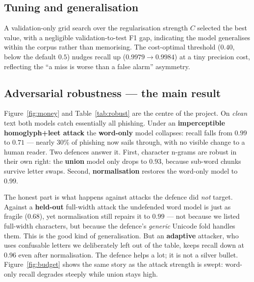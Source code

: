 \documentclass[11pt]{article}
\begin{document}
\subsection{Tuning and generalisation}
A validation-only grid search over the regularisation strength $C$ selected the best
value, with a negligible validation-to-test F1 gap, indicating the model generalises
within the corpus rather than memorising. The cost-optimal threshold ($0.40$, below
the default $0.5$) nudges recall up ($0.9979 \rightarrow 0.9984$) at a tiny precision
cost, reflecting the ``a miss is worse than a false alarm'' asymmetry.

\subsection{Adversarial robustness --- the main result}
\label{sec:robust}
Figure~\ref{fig:money} and Table~\ref{tab:robust} are the centre of the project. On
\emph{clean} text both models catch essentially all phishing. Under an
\textbf{imperceptible homoglyph+leet attack} the \textbf{word-only} model collapses:
recall falls from $0.99$ to $0.71$ --- nearly 30\% of phishing now sails through,
with no visible change to a human reader. Two defences answer it. First, character
n-grams are robust in their own right: the \textbf{union} model only drops to
$0.93$, because sub-word chunks survive letter swaps. Second, \textbf{normalisation}
restores the word-only model to $0.99$.

The honest part is what happens against attacks the defence did \emph{not} target.
Against a \textbf{held-out} full-width attack the undefended word model is just as
fragile ($0.68$), yet normalisation still repairs it to $0.99$ --- not because we
listed full-width characters, but because the defence's \emph{generic} Unicode fold
handles them. This is the good kind of generalisation. But an \textbf{adaptive}
attacker, who uses confusable letters we deliberately left out of the table, keeps
recall down at $0.96$ even after normalisation. The defence helps a lot; it is not a
silver bullet. Figure~\ref{fig:budget} shows the same story as the attack strength is
swept: word-only recall degrades steeply while union stays high.
\end{document}
